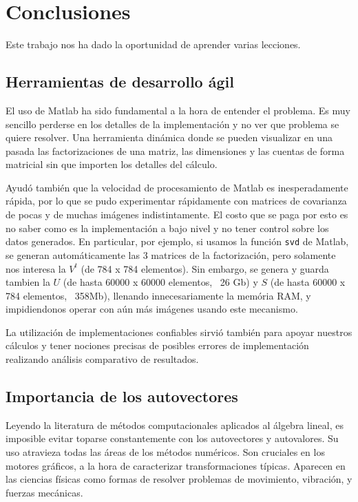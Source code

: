 \section{Conclusiones}

Este trabajo nos ha dado la oportunidad de aprender varias lecciones.

\subsection{Herramientas de desarrollo \'agil}

El uso de Matlab ha sido fundamental a la hora de entender el problema.
Es muy sencillo perderse en los detalles de la implementaci\'on y no ver que
problema se quiere resolver. Una herramienta din\'amica donde se pueden visualizar
en una pasada las factorizaciones de una matriz, las dimensiones y las cuentas
de forma matricial sin que importen los detalles del c\'alculo.

Ayud\'o tambi\'en que la velocidad de procesamiento de Matlab es inesperadamente
r\'apida, por lo que se pudo experimentar r\'apidamente con matrices de covarianza
de pocas y de muchas im\'agenes indistintamente. El costo que se paga por esto es
no saber como es la implementaci\'on a bajo nivel y no tener control sobre los datos generados.
En particular, por ejemplo, si usamos la funci\'on \texttt{svd} de Matlab, se
generan autom\'aticamente las 3 matrices de la factorizaci\'on, pero solamente nos interesa
la $V^t$ (de 784 x 784 elementos). Sin embargo, se genera y guarda tambien la $U$ (de hasta
60000 x 60000 elementos, ~26 Gb) y $S$ (de hasta 60000 x 784 elementos, ~358Mb), llenando innecesariamente
la mem\'oria RAM, y impidiendonos operar con a\'un m\'as im\'agenes usando este mecanismo.

La utilizaci\'on de implementaciones confiables sirvi\'o tambi\'en para apoyar nuestros
c\'alculos y tener nociones precisas de posibles errores de implementaci\'on
realizando an\'alisis comparativo de resultados.

\subsection{Importancia de los autovectores}

Leyendo la literatura de m\'etodos computacionales aplicados al \'algebra lineal, es
imposible evitar toparse constantemente con los autovectores y autovalores. Su
uso atravieza todas las \'areas de los m\'etodos num\'ericos. Son cruciales
en los motores gr\'aficos, a la hora de caracterizar transformaciones t\'ipicas.
Aparecen en las ciencias f\'isicas como formas de resolver problemas de movimiento,
vibraci\'on, y fuerzas mec\'anicas.


